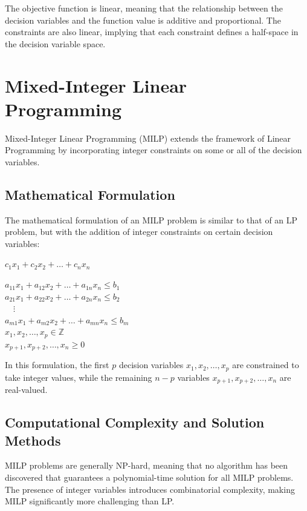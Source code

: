 The objective function is linear, meaning that the relationship between the decision variables and the function value is additive and proportional. The constraints are also linear, implying that each constraint defines a half-space in the decision variable space.


\section{Mixed-Integer Linear Programming}
Mixed-Integer Linear Programming (MILP) extends the framework of Linear Programming by incorporating integer constraints on some or all of the decision variables. 

\subsection{Mathematical Formulation}
The mathematical formulation of an MILP problem is similar to that of an LP problem, but with the addition of integer constraints on certain decision variables:


\begin{center}
    $c_1x_1 + c_2x_2 + \dots + c_nx_n $
\end{center}
\begin{center}
    $  a_{11}x_1 + a_{12}x_2 + \dots + a_{1n}x_n \leq b_1 $ \\
    $ a_{21}x_1 + a_{22}x_2 + \dots + a_{2n}x_n \leq b_2 $ \\
    $ \quad \vdots $ \\
    $ a_{m1}x_1 + a_{m2}x_2 + \dots + a_{mn}x_n \leq b_m $ \\
    $ x_1, x_2, \dots, x_p \in \mathbb{Z} $ \\
    $ x_{p+1}, x_{p+2}, \dots, x_n \geq 0 $
\end{center}



In this formulation, the first $ p $ decision variables $ x_1, x_2, \dots, x_p $ are constrained to take integer values, while the remaining $ n-p $ variables $ x_{p+1}, x_{p+2}, \dots, x_n $ are real-valued. 

\newpage
\subsection{Computational Complexity and Solution Methods}
MILP problems are generally NP-hard, meaning that no algorithm has been discovered that guarantees a polynomial-time solution for all MILP problems. The presence of integer variables introduces combinatorial complexity, making MILP significantly more challenging than LP.

